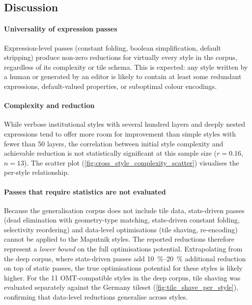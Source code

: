 \subsection{Discussion}\label{sub_cross_discussion}

\paragraph{Universality of expression passes}
Expression-level passes (constant folding, boolean simplification, default stripping) produce non-zero reductions for virtually every style in the corpus, regardless of its complexity or tile schema.
This is expected: any style written by a human or generated by an editor is likely to contain at least some redundant expressions, default-valued properties, or suboptimal colour encodings.

\paragraph{Complexity and reduction}
While verbose institutional styles with several hundred layers and deeply nested expressions tend to offer more room for improvement than simple styles with fewer than 50 layers, the correlation between initial style complexity and achievable reduction is not statistically significant at this sample size ($r = 0.16$, $n = 13$).
The scatter plot (\cref{fig:cross_style_complexity_scatter}) visualises the per-style relationship.

\paragraph{Passes that require statistics are not evaluated}
Because the generalisation corpus does not include tile data, stats-driven passes (dead elimination with geometry-type matching, stats-driven constant folding, selectivity reordering) and data-level optimisations (tile shaving, re-encoding) cannot be applied to the Maputnik styles.
The reported reductions therefore represent a \emph{lower bound} on the full optimisations potential.
Extrapolating from the deep corpus, where stats-driven passes add \qtyrange{10}{20}{\percent} additional reduction on top of static passes, the true optimisations potential for these styles is likely higher.
For the 11 \ac{OMT}-compatible styles in the deep corpus, tile shaving was evaluated separately against the Germany tileset (\cref{fig:tile_shave_per_style}), confirming that data-level reductions generalise across styles.

